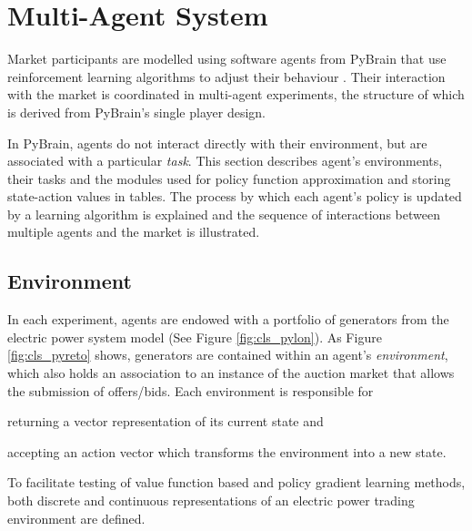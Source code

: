 \section{Multi-Agent System}
\label{sec:mas}
Market participants are modelled using software agents from PyBrain that use
reinforcement learning algorithms to adjust their behaviour \cite{schaul:2010}.
Their interaction with the market is coordinated in multi-agent experiments,
the structure of which is derived from PyBrain's single player design.

In PyBrain, agents do not interact directly with their environment, but are
associated with a particular \textit{task}.  This section describes agent's
environments, their tasks and the modules used for policy function
approximation and storing state-action values in tables. The process by which
each agent's policy is updated by a learning algorithm is explained and the
sequence of interactions between multiple agents and the market is illustrated.

\subsection{Environment}
In each experiment, agents are endowed with a portfolio of generators from the
electric power system model (See Figure \ref{fig:cls_pylon}).  As Figure
\ref{fig:cls_pyreto} shows, generators are contained within an agent's
\textit{environment}, which also holds an association to an instance of the
auction market that allows the submission of offers/bids. Each environment is
responsible for \begin{inparaenum}[(i)]
\item returning a vector representation of its current state and \item
accepting an action vector which transforms the environment into a new state.
\end{inparaenum}  To facilitate testing of value function based and policy
gradient learning methods, both discrete and continuous representations of an
electric power trading environment are defined.
%

